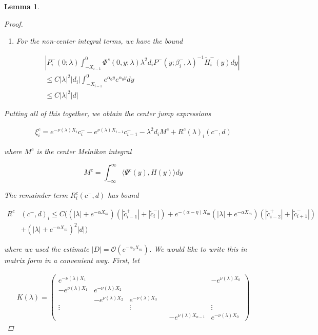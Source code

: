 \documentclass[12pt]{article}
\newtheorem{lemma}{Lemma}
\begin{document}
\begin{lemma}
\begin{proof}
\begin{enumerate}
\item For the non-center integral terms, we have the bound

\begin{align*}
&\left| P_i^-(0; \lambda) 
\int_{-X_{i-1}}^0 \Phi^s(0, y; \lambda) \lambda^2 d_i P^-(y; \beta_i^-, \lambda)^{-1} \tilde{H}_i^-(y) dy \right| \\
&\leq C |\lambda|^2 |d_i| \int_{-X_{i-1}}^0 e^{\alpha_0 y} e^{\alpha_0 y} dy \\
&\leq C |\lambda|^2 |d|
\end{align*}

\end{enumerate}

Putting all of this together, we obtain the center jump expressions

\begin{align*}
\xi^c_i = e^{-\nu(\lambda) X_i} c_i^- - e^{\nu(\lambda) X_{i-1}} c_{i-1}^- - \lambda^2 d_i M^c + R^c(\lambda)_i(c^-, d)
\end{align*}

where $M^c$ is the center Melnikov integral

\[
M^c = \int_{-\infty}^\infty \langle \Psi^c(y), H(y) \rangle dy 
\]

The remainder term $R^c_i(c^-, d)$ has bound

\begin{align*}
R^c&(c^-, d)_i \leq C \Big(
(|\lambda| + e^{-\alpha X_m})(|\tilde{c}_{i-1}^+| + |\tilde{c}_{i}^-|) + e^{-(\alpha - \eta) X_m } (|\lambda| + e^{-\alpha X_m})(  |\tilde{c}_{i-2}^+| + |\tilde{c}_{i+1}^-|)  \\
&+ (|\lambda| + e^{-\alpha X_m})^2 |d|
\Big)
\end{align*}

where we used the estimate $|D| = \mathcal{O}(e^{-\alpha_0 X_m})$. We would like to write this in matrix form in a convenient way. First, let

\begin{align*}
K(\lambda) =  
\begin{pmatrix}
e^{-\nu(\lambda)X_1} & & & & & -e^{\nu(\lambda)X_0} \\
-e^{\nu(\lambda)X_1} & e^{-\nu(\lambda)X_2} \\
& -e^{\nu(\lambda)X_2} & e^{-\nu(\lambda)X_3} \\
\vdots & & \vdots & &&  \vdots \\
& & & & -e^{\nu(\lambda)X_{n-1}} & e^{-\nu(\lambda)X_0} 
\end{pmatrix}
\end{align*}


\end{proof}
\end{lemma}
\end{document}
